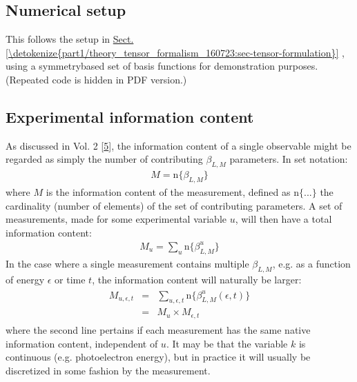 \documentclass[letterpaper,table,10pt,english]{jupyterBook}
\begin{document}
\subsection{Numerical setup}
\label{\detokenize{part1/theory_info_content_221122:numerical-setup}}
\sphinxAtStartPar
This follows the setup in \hyperref[\detokenize{part1/theory_tensor_formalism_160723:sec-tensor-formulation}]{Sect.\@ \ref{\detokenize{part1/theory_tensor_formalism_160723:sec-tensor-formulation}}} {\hyperref[\detokenize{part1/theory_tensor_formalism_160723:sec-tensor-formulation}]{}}, using a symmetry\sphinxhyphen{}based set of basis functions for demonstration purposes. (Repeated code is hidden in PDF version.)


\subsection{Experimental information content}
\label{\detokenize{part1/theory_info_content_221122:experimental-information-content}}\label{\detokenize{part1/theory_info_content_221122:sec-expt-info-content}}
\sphinxAtStartPar
As discussed in  Vol. 2 {[}\hyperlink{cite.backmatter/bibliography:id664}{5}{]}, the information content of a single observable might be regarded as simply the number of contributing \(\beta_{L,M}\) parameters. In set notation:
\begin{equation}\label{equation:part1/theory_info_content_221122:eq:BLM-set}
\begin{split}M=\mathrm{n}\{\beta_{L,M}\}\end{split}
\end{equation}
\sphinxAtStartPar
where \(M\) is the information content of the measurement, defined as
\(\mathrm{n}\{...\}\) the cardinality (number of elements) of the set of
contributing parameters. A set of measurements, made for some
experimental variable \(u\), will then have a total information content:
\begin{equation*}
\begin{split}M_{u}=\sum_{u}\mathrm{n}\{\beta_{L,M}^{u}\}\end{split}
\end{equation*}
\sphinxAtStartPar
In the case where a single measurement contains multiple \(\beta_{L,M}\),
e.g. as a function of energy \(\epsilon\) or time \(t\), the information
content will naturally be larger:
\begin{equation*}
\begin{split}\begin{aligned}
M_{u,\epsilon,t} & = & \sum_{u,\epsilon,t}\mathrm{n}\{\beta_{L,M}^{u}(\epsilon,t)\}\\
 & = & M_{u}\times M_{\epsilon,t}\end{aligned}\end{split}
\end{equation*}
\sphinxAtStartPar
where the second line pertains if each measurement has the same native
information content, independent of \(u\). It may be that the variable \(k\)
is continuous (e.g. photoelectron energy), but in practice it will
usually be discretized in some fashion by the measurement.
\end{document}
